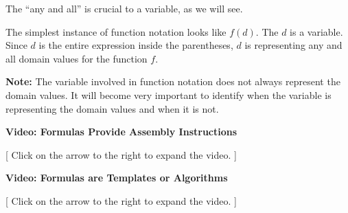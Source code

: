 \documentclass{ximera}
\begin{document}
The ``any and all'' is crucial to a variable, as we will see. 


The simplest instance of function notation looks like $f(d)$.  The $d$ is a variable.  Since $d$ is the entire expression inside the parentheses, $d$ is representing any and all domain values for the function $f$.


\textbf{Note:} The variable involved in function notation does not always represent the domain values. It will become very important to identify when the variable is representing the domain values and when it is not. 


\begin{explanation} \textbf{\textcolor{red!75!green}{Video: Formulas Provide Assembly Instructions}}

[ Click on the arrow to the right to expand the video. ]
\begin{expandable} 

\begin{center}
\end{center}

\end{expandable}
\end{explanation}



\begin{explanation} \textbf{\textcolor{red!75!green}{Video: Formulas are Templates or Algorithms}}

[ Click on the arrow to the right to expand the video. ]
\begin{expandable} 

\begin{center}
\end{center}

\end{expandable}
\end{explanation}
\end{document}
